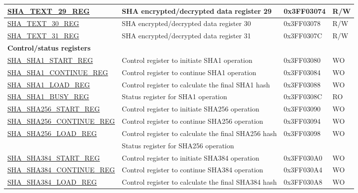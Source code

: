 \begin{longtable}{ | p{5cm} | p{7cm} | p{2cm} | p{1cm} | }
\hyperref[regdesc:SHATEXTnREG]{SHA\_TEXT\_29\_REG} & SHA encrypted/decrypted data register 29 & 0x3FF03074 & R/W \\ \hline
\hyperref[regdesc:SHATEXTnREG]{SHA\_TEXT\_30\_REG} & SHA encrypted/decrypted data register 30 & 0x3FF03078 & R/W \\ \hline
\hyperref[regdesc:SHATEXTnREG]{SHA\_TEXT\_31\_REG} & SHA encrypted/decrypted data register 31 & 0x3FF0307C & R/W \\ \hline
\multicolumn{4}{|l|}{\textbf{Control/status registers}} \\ \hline
\hyperref[regdesc:SHASHA1STARTREG]{SHA\_SHA1\_START\_REG} & Control register to initiate SHA1 operation & 0x3FF03080 & WO \\ \hline
\hyperref[regdesc:SHASHA1CONTINUEREG]{SHA\_SHA1\_CONTINUE\_REG} & Control register to continue SHA1 operation & 0x3FF03084 & WO \\ \hline
\hyperref[regdesc:SHASHA1LOADREG]{SHA\_SHA1\_LOAD\_REG} & Control register to calculate the final SHA1 hash & 0x3FF03088 & WO \\ \hline
\hyperref[regdesc:SHASHA1BUSYREG]{SHA\_SHA1\_BUSY\_REG} & Status register for SHA1 operation & 0x3FF0308C & RO \\ \hline
\hyperref[regdesc:SHASHA256STARTREG]{SHA\_SHA256\_START\_REG} & Control register to initiate SHA256 operation & 0x3FF03090 & WO \\ \hline
\hyperref[regdesc:SHASHA256CONTINUEREG]{SHA\_SHA256\_CONTINUE\_REG} & Control register to continue SHA256 operation & 0x3FF03094 & WO \\ \hline
\multirow{2}{*}{\hyperref[regdesc:SHASHA256LOADREG]{SHA\_SHA256\_LOAD\_REG}} & Control register to calculate the final SHA256 hash &\multirow{2}{*}{0x3FF03098} &\multirow{2}{*}{WO} \\ \hline
\hyperref[regdesc:SHASHA256BUSYREG]{SHA\_SHA256\_BUSY\_REG} & Status register for SHA256 operation & 0x3FF0309C & RO \\ \hline
\hyperref[regdesc:SHASHA384STARTREG]{SHA\_SHA384\_START\_REG} & Control register to initiate SHA384 operation & 0x3FF030A0 & WO \\ \hline
\hyperref[regdesc:SHASHA384CONTINUEREG]{SHA\_SHA384\_CONTINUE\_REG} & Control register to continue SHA384 operation & 0x3FF030A4 & WO \\ \hline
\multirow{2}{*}{\hyperref[regdesc:SHASHA384LOADREG]{SHA\_SHA384\_LOAD\_REG}} & Control register to calculate the final SHA384 hash & \multirow{2}{*}{0x3FF030A8} & \multirow{2}{*}{WO} \\ \hline

\end{longtable}
